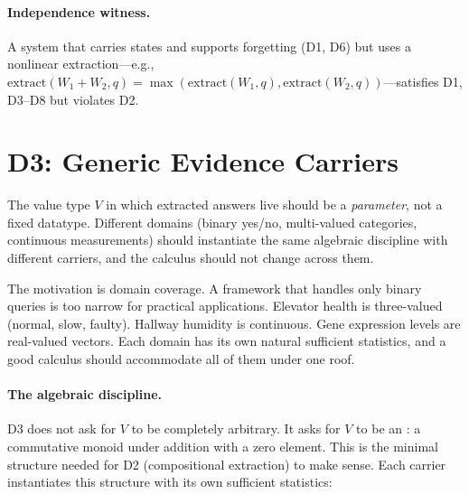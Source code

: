 \documentclass[11pt,openany]{report}
\begin{document}
\paragraph{Independence witness.}
A system that carries states and supports forgetting (D1, D6) but
uses a nonlinear extraction---e.g.,
$\mathrm{extract}(W_1 + W_2, q) = \max(\mathrm{extract}(W_1, q),
\mathrm{extract}(W_2, q))$---satisfies D1, D3--D8 but violates D2.



\section{D3: Generic Evidence Carriers}
\label{sec:d3}

\begin{definition}
\label{def:d3}
The value type $V$ in which extracted answers live should be a
\emph{parameter}, not a fixed datatype.  Different domains (binary
yes/no, multi-valued categories, continuous measurements) should
instantiate the same algebraic discipline with different carriers,
and the calculus should not change across them.
\end{definition}

\noindent
The motivation is domain coverage.  A framework that handles only
binary queries is too narrow for practical applications.  Elevator
health is three-valued (normal, slow, faulty).  Hallway humidity is
continuous.  Gene expression levels are real-valued vectors.  Each
domain has its own natural sufficient statistics, and a good calculus
should accommodate all of them under one roof.

\paragraph{The algebraic discipline.}
D3 does not ask for $V$ to be completely arbitrary.  It asks for $V$ to
be an : a commutative monoid under addition with a
zero element.  This is the minimal structure needed for D2
(compositional extraction) to make sense.  Each carrier instantiates
this structure with its own sufficient statistics:
\end{document}
